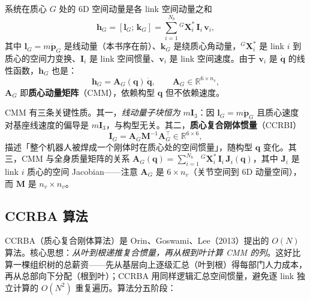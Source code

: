 \begin{definition}
\label{def:cmm}
系统在质心 $G$ 处的 6D 空间动量是各 link 空间动量之和
\begin{equation}
  \boldsymbol{h}_G=[\boldsymbol{l}_G;\,\boldsymbol{k}_G]=\sum_{i=1}^{N_b}{}^G\mathbf{X}_i^*\,\mathbf{I}_i\,\boldsymbol{v}_i,
  \label{eq:centroidal-momentum}
\end{equation}
其中 $\boldsymbol{l}_G=m\dot{\boldsymbol{p}}_G$ 是线动量（本书序在前）、$\boldsymbol{k}_G$ 是绕质心角动量，${}^G\mathbf{X}_i^*$ 是 link $i$ 到质心的空间力变换、$\mathbf{I}_i$ 是 link 空间惯量、$\boldsymbol{v}_i$ 是 link 空间速度。由于 $\boldsymbol{v}_i$ 是 $\dot{\boldsymbol{q}}$ 的线性函数，$\boldsymbol{h}_G$ 也是：
\begin{equation}
  \boldsymbol{h}_G=\mathbf{A}_G(\boldsymbol{q})\,\dot{\boldsymbol{q}},\qquad \mathbf{A}_G\in\mathbb{R}^{6\times n_v},
  \label{eq:cmm-linear}
\end{equation}
$\mathbf{A}_G$ 即\textbf{质心动量矩阵}（CMM），依赖构型 $\boldsymbol{q}$ 但不依赖速度。
\end{definition}

\noindent CMM 有三条关键性质。其一，\emph{线动量子块恒为 $m\mathbf{I}_3$}：因 $\boldsymbol{l}_G=m\dot{\boldsymbol{p}}_G$ 且质心速度对基座线速度的偏导是 $m\mathbf{I}_3$，与构型无关。其二，\textbf{质心复合刚体惯量}（CCRBI）
\begin{equation}
  \mathbf{I}_G=\mathbf{A}_G\mathbf{M}^{-1}\mathbf{A}_G^\top\in\mathbb{R}^{6\times6},
  \label{eq:ccrbi}
\end{equation}
描述「整个机器人被焊成一个刚体时在质心处的空间惯量」，随构型 $\boldsymbol{q}$ 变化。其三，CMM 与全身质量矩阵的关系 $\mathbf{A}_G(\boldsymbol{q})=\sum_{i=1}^{N_b}{}^G\mathbf{X}_i^*\,\mathbf{I}_i\,\mathbf{J}_i(\boldsymbol{q})$，其中 $\mathbf{J}_i$ 是 link $i$ 质心的空间 Jacobian——注意 $\mathbf{A}_G$ 是 $6\times n_v$（关节空间到 6D 动量空间），而 $\mathbf{M}$ 是 $n_v\times n_v$。

\subsection{CCRBA 算法}
\label{subsec:ccrba}

CCRBA（质心复合刚体算法）是 Orin、Goswami、Lee（2013）提出的 $O(N)$ 算法\cite{orin2013centroidal}。核心思想：\emph{从叶到根递推复合惯量，再从根到叶计算 CMM 的列}。这好比算一棵组织树的总薪资——先从基层向上逐级汇总（叶到根）得每部门人力成本，再从总部向下分配（根到叶）；CCRBA 用同样逻辑汇总空间惯量，避免逐 link 独立计算的 $O(N^2)$ 重复遍历。算法分五阶段：

